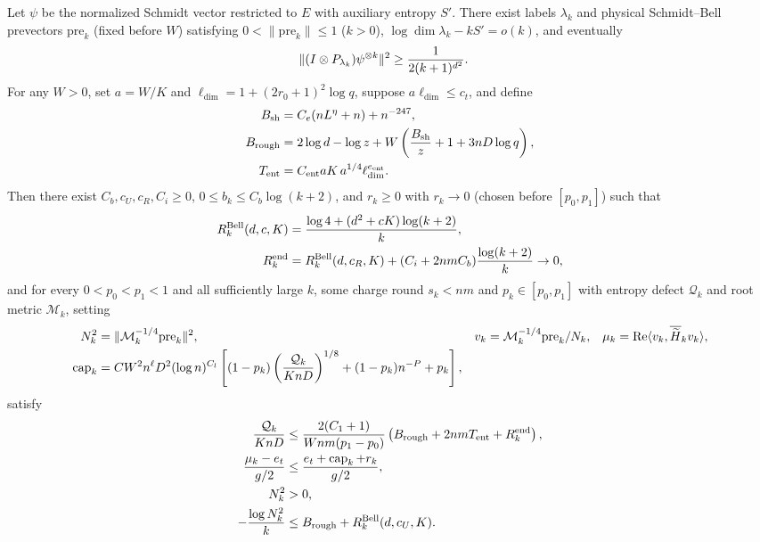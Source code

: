 \begin{lemma}
    Let $\psi$ be the normalized Schmidt vector restricted to $E$ with auxiliary entropy $S'$. There exist labels $\lambda_k$ and physical Schmidt--Bell prevectors $\mathrm{pre}_k$ (fixed before $W$) satisfying
    $0<\|\mathrm{pre}_k\|\leq1$ ($k>0$), $\log\dim\lambda_k-kS'=o(k)$, and eventually
    \begin{align}
        \|(I\otimes P_{\lambda_k})\psi^{\otimes k}\|^2
         & \geq\frac1{2(k+1)^{d^2}}.\notag
    \end{align}
    For any $W>0$, set $a=W/K$ and $\ell_{\dim}=1+(2r_0+1)^2\log q$, suppose $a\ell_{\dim}\leq c_t$, and define
    \begin{align}
        B_{\rm sh}  & =C_e(nL^\eta+n)+n^{-247},\notag                   \\
        B_{\rm rough}
                    & =2\log d-\log z+
        W\left(\frac{B_{\rm sh}}z+1+3nD\log q\right),\notag             \\
        T_{\rm ent} & =C_{\rm ent}aK\,a^{1/4}\ell_{\dim}^{e_{\rm ent}}.
        \label{eq:arealaw-charge-budgets}
    \end{align}
    Then there exist $C_b,c_U,c_R,C_i\ge0$, $0\leq b_k\leq C_b\log(k+2)$, and $r_k\geq0$ with $r_k\to0$ (chosen before $[p_0,p_1]$) such that
    \begin{align}
        R_k^{\rm Bell}(d,c,K)
         & =\frac{\log4+(d^2+cK)\log(k+2)}k,\notag \\
        R_k^{\rm end}
         & =R_k^{\rm Bell}(d,c_R,K)
        +(C_i+2nmC_b)\frac{\log(k+2)}k\to 0,\notag
    \end{align}
    and for every $0<p_0<p_1<1$ and all sufficiently large $k$, some charge
    round $s_k<nm$ and $p_k\in[p_0,p_1]$ with entropy defect $\mathcal Q_k$ and root metric $\mathcal M_k$, setting
    \begin{align}
        N_k^2 & =\|\mathcal M_k^{-1/4}\mathrm{pre}_k\|^2, &
        v_k   & =\mathcal M_k^{-1/4}\mathrm{pre}_k/N_k,   &
        \mu_k & =\operatorname{Re}\langle v_k,
        \overline{\widetilde H}_k v_k\rangle,\notag         \\
        \operatorname{cap}_k
              & =CW^2n^\ell D^2(\log n)^{C_l}
        \left[(1-p_k)\left(\frac{\mathcal Q_k}{KnD}\right)^{1/8}
            +(1-p_k)n^{-P}+p_k\right],\notag
    \end{align}
    satisfy
    \begin{align}
        \frac{\mathcal Q_k}{KnD}
              & \leq\frac{2(C_1+1)}{Wnm(p_1-p_0)}
        \left(B_{\rm rough}+2nmT_{\rm ent}+R_k^{\rm end}\right),\notag \\
        \frac{\mu_k-e_t}{g/2}
              & \leq\frac{e_t+\operatorname{cap}_k+r_k}{g/2},\notag    \\
        N_k^2 & >0,\notag                                              \\
        -\frac{\log N_k^2}{k}
              & \leq B_{\rm rough}+R_k^{\rm Bell}(d,c_U,K).
        \label{eq:arealaw-charge-selection}
    \end{align}
\end{lemma}
